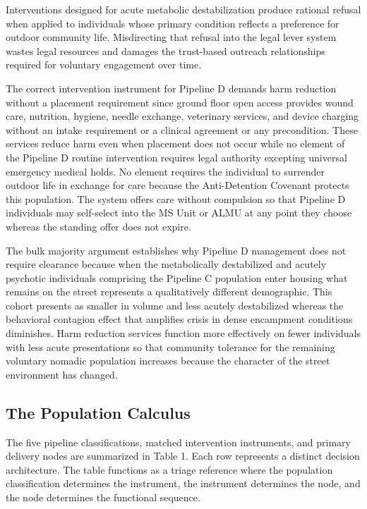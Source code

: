 \documentclass[12pt, letterpaper]{article}
\begin{document}
Interventions designed for acute metabolic destabilization produce rational refusal when applied to individuals whose primary condition reflects a preference for outdoor community life. Misdirecting that refusal into the legal lever system wastes legal resources and damages the trust-based outreach relationships required for voluntary engagement over time.

The correct intervention instrument for Pipeline D demands harm reduction without a placement requirement since ground floor open access provides wound care, nutrition, hygiene, needle exchange, veterinary services, and device charging without an intake requirement or a clinical agreement or any precondition. These services reduce harm even when placement does not occur while no element of the Pipeline D routine intervention requires legal authority excepting universal emergency medical holds. No element requires the individual to surrender outdoor life in exchange for care because the Anti-Detention Covenant protects this population. The system offers care without compulsion so that Pipeline D individuals may self-select into the MS Unit or ALMU at any point they choose whereas the standing offer does not expire.

The bulk majority argument establishes why Pipeline D management does not require clearance because when the metabolically destabilized and acutely psychotic individuals comprising the Pipeline C population enter housing what remains on the street represents a qualitatively different demographic. This cohort presents as smaller in volume and less acutely destabilized whereas the behavioral contagion effect that amplifies crisis in dense encampment conditions diminishes. Harm reduction services function more effectively on fewer individuals with less acute presentations so that community tolerance for the remaining voluntary nomadic population increases because the character of the street environment has changed.

\subsection{The Population Calculus}

The five pipeline classifications, matched intervention instruments, and primary delivery nodes are summarized in Table 1. Each row represents a distinct decision architecture. The table functions as a triage reference where the population classification determines the instrument, the instrument determines the node, and the node determines the functional sequence.
\end{document}
